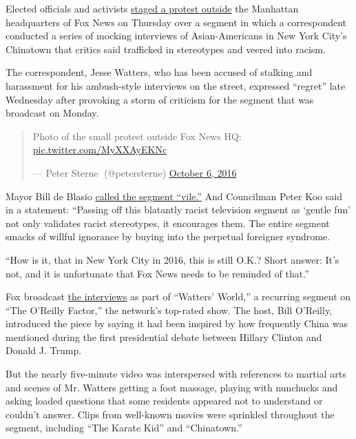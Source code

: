 Elected officials and activists
\href{https://twitter.com/petersterne/status/784129892942278658}{staged
a protest outside} the Manhattan headquarters of Fox News on Thursday
over a segment in which a correspondent conducted a series of mocking
interviews of Asian-Americans in New York City's Chinatown that critics
said trafficked in stereotypes and veered into racism.

The correspondent, Jesse Watters, who has been accused of stalking and
harassment for his ambush-style interviews on the street, expressed
``regret'' late Wednesday after provoking a storm of criticism for the
segment that was broadcast on Monday.

\begin{quote}
Photo of the small protest outside Fox News HQ:
\href{https://t.co/MyXXAyEKNc}{pic.twitter.com/MyXXAyEKNc}

--- Peter Sterne🌹 (@petersterne)
\href{https://twitter.com/petersterne/status/784129892942278658?ref_src=twsrc\%5Etfw}{October
6, 2016}
\end{quote}

Mayor Bill de Blasio
\href{https://twitter.com/BilldeBlasio/status/783830241672331264}{called
the segment ``vile.''} And Councilman Peter Koo said in a statement:
``Passing off this blatantly racist television segment as `gentle fun'
not only validates racist stereotypes, it encourages them. The entire
segment smacks of willful ignorance by buying into the perpetual
foreigner syndrome.

``How is it, that in New York City in 2016, this is still O.K.? Short
answer: It's not, and it is unfortunate that Fox News needs to be
reminded of that.''

Fox broadcast
\href{https://www.youtube.com/watch?v=PJmnLzw8NA4\&feature=youtu.be}{the
interviews} as part of ``Watters' World,'' a recurring segment on ``The
O'Reilly Factor,'' the network's top-rated show. The host, Bill
O'Reilly, introduced the piece by saying it had been inspired by how
frequently China was mentioned during the first presidential debate
between Hillary Clinton and Donald J. Trump.

But the nearly five-minute video was interspersed with references to
martial arts and scenes of Mr. Watters getting a foot massage, playing
with nunchucks and asking loaded questions that some residents appeared
not to understand or couldn't answer. Clips from well-known movies were
sprinkled throughout the segment, including ``The Karate Kid'' and
``Chinatown.''

